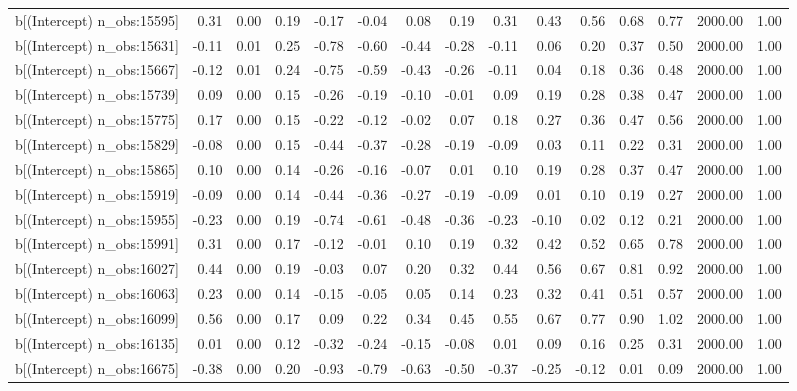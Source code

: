 \begin{table}[ht]
\begin{tabular}{rrrrrrrrrrrrrrr}
  b[(Intercept) n\_obs:15595] & 0.31 & 0.00 & 0.19 & -0.17 & -0.04 & 0.08 & 0.19 & 0.31 & 0.43 & 0.56 & 0.68 & 0.77 & 2000.00 & 1.00 \\ 
  b[(Intercept) n\_obs:15631] & -0.11 & 0.01 & 0.25 & -0.78 & -0.60 & -0.44 & -0.28 & -0.11 & 0.06 & 0.20 & 0.37 & 0.50 & 2000.00 & 1.00 \\ 
  b[(Intercept) n\_obs:15667] & -0.12 & 0.01 & 0.24 & -0.75 & -0.59 & -0.43 & -0.26 & -0.11 & 0.04 & 0.18 & 0.36 & 0.48 & 2000.00 & 1.00 \\ 
  b[(Intercept) n\_obs:15739] & 0.09 & 0.00 & 0.15 & -0.26 & -0.19 & -0.10 & -0.01 & 0.09 & 0.19 & 0.28 & 0.38 & 0.47 & 2000.00 & 1.00 \\ 
  b[(Intercept) n\_obs:15775] & 0.17 & 0.00 & 0.15 & -0.22 & -0.12 & -0.02 & 0.07 & 0.18 & 0.27 & 0.36 & 0.47 & 0.56 & 2000.00 & 1.00 \\ 
  b[(Intercept) n\_obs:15829] & -0.08 & 0.00 & 0.15 & -0.44 & -0.37 & -0.28 & -0.19 & -0.09 & 0.03 & 0.11 & 0.22 & 0.31 & 2000.00 & 1.00 \\ 
  b[(Intercept) n\_obs:15865] & 0.10 & 0.00 & 0.14 & -0.26 & -0.16 & -0.07 & 0.01 & 0.10 & 0.19 & 0.28 & 0.37 & 0.47 & 2000.00 & 1.00 \\ 
  b[(Intercept) n\_obs:15919] & -0.09 & 0.00 & 0.14 & -0.44 & -0.36 & -0.27 & -0.19 & -0.09 & 0.01 & 0.10 & 0.19 & 0.27 & 2000.00 & 1.00 \\ 
  b[(Intercept) n\_obs:15955] & -0.23 & 0.00 & 0.19 & -0.74 & -0.61 & -0.48 & -0.36 & -0.23 & -0.10 & 0.02 & 0.12 & 0.21 & 2000.00 & 1.00 \\ 
  b[(Intercept) n\_obs:15991] & 0.31 & 0.00 & 0.17 & -0.12 & -0.01 & 0.10 & 0.19 & 0.32 & 0.42 & 0.52 & 0.65 & 0.78 & 2000.00 & 1.00 \\ 
  b[(Intercept) n\_obs:16027] & 0.44 & 0.00 & 0.19 & -0.03 & 0.07 & 0.20 & 0.32 & 0.44 & 0.56 & 0.67 & 0.81 & 0.92 & 2000.00 & 1.00 \\ 
  b[(Intercept) n\_obs:16063] & 0.23 & 0.00 & 0.14 & -0.15 & -0.05 & 0.05 & 0.14 & 0.23 & 0.32 & 0.41 & 0.51 & 0.57 & 2000.00 & 1.00 \\ 
  b[(Intercept) n\_obs:16099] & 0.56 & 0.00 & 0.17 & 0.09 & 0.22 & 0.34 & 0.45 & 0.55 & 0.67 & 0.77 & 0.90 & 1.02 & 2000.00 & 1.00 \\ 
  b[(Intercept) n\_obs:16135] & 0.01 & 0.00 & 0.12 & -0.32 & -0.24 & -0.15 & -0.08 & 0.01 & 0.09 & 0.16 & 0.25 & 0.31 & 2000.00 & 1.00 \\ 
  b[(Intercept) n\_obs:16675] & -0.38 & 0.00 & 0.20 & -0.93 & -0.79 & -0.63 & -0.50 & -0.37 & -0.25 & -0.12 & 0.01 & 0.09 & 2000.00 & 1.00 \\ 

\end{tabular}
\end{table}
